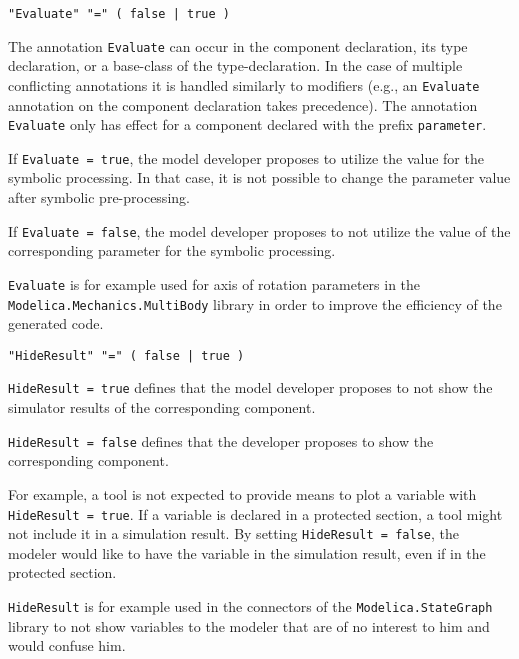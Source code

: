 \begin{annotationdefinition}[Evaluate]
\begin{synopsis}[grammar]\begin{lstlisting}
"Evaluate" "=" ( false | true )
\end{lstlisting}\end{synopsis}
\begin{semantics}
The annotation \lstinline!Evaluate! can occur in the component declaration, its type declaration, or a base-class of the type-declaration.  In the case of multiple conflicting annotations it is handled similarly to modifiers (e.g., an \lstinline!Evaluate! annotation on the component declaration takes precedence).  The annotation \lstinline!Evaluate! only has effect for a component declared with the prefix \lstinline!parameter!.

If \lstinline!Evaluate = true!, the model developer proposes to utilize the value for the symbolic processing. In that case, it is not possible to change the parameter value after symbolic pre-processing.

If \lstinline!Evaluate = false!, the model developer proposes to not utilize the value of the corresponding parameter for the symbolic processing.

\begin{nonnormative}
\lstinline!Evaluate! is for example used for axis of rotation parameters in the \lstinline!Modelica.Mechanics.MultiBody! library in order to improve the efficiency of the generated code.
\end{nonnormative}
\end{semantics}
\end{annotationdefinition}

\begin{annotationdefinition}[HideResult]
\begin{synopsis}[grammar]\begin{lstlisting}
"HideResult" "=" ( false | true )
\end{lstlisting}\end{synopsis}
\begin{semantics}
\lstinline!HideResult = true! defines that the model developer proposes to not show the simulator results of the corresponding component.

\lstinline!HideResult = false! defines that the developer proposes to show the corresponding component.

\begin{nonnormative}
For example, a tool is not expected to provide means to plot a variable with \lstinline!HideResult = true!.  If a variable is declared in a protected section, a tool might not include it in a simulation result. By setting \lstinline!HideResult = false!, the modeler would like to have the variable in the simulation result, even if in the protected section.

\lstinline!HideResult! is for example used in the connectors of the \lstinline!Modelica.StateGraph! library to not show variables to the modeler that are of no interest to him and would confuse him.
\end{nonnormative}
\end{semantics}
\end{annotationdefinition}


